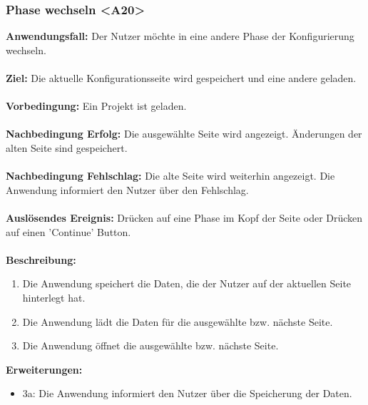 \documentclass[parskip=full]{scrartcl} %
\begin{document}
\subsubsection*{Phase wechseln <A20>}
\textbf{Anwendungsfall:} Der Nutzer möchte in eine andere Phase der Konfigurierung wechseln.\\\\
\textbf{Ziel:} Die aktuelle Konfigurationsseite wird gespeichert und eine andere geladen. \\\\
\textbf{Vorbedingung:} Ein Projekt ist geladen. \\\\
\textbf{Nachbedingung Erfolg:} Die ausgewählte Seite wird angezeigt. Änderungen der alten Seite sind gespeichert.\\\\
\textbf{Nachbedingung Fehlschlag:} Die alte Seite wird weiterhin angezeigt. Die Anwendung informiert den Nutzer über den Fehlschlag. \\\\
\textbf{Auslösendes Ereignis:} Drücken auf eine Phase im Kopf der Seite oder Drücken auf einen 'Continue' Button. \\\\
\textbf{Beschreibung:}
\begin{enumerate}
    \item Die Anwendung speichert die Daten, die der Nutzer auf der aktuellen Seite hinterlegt hat.
    \item Die Anwendung lädt die Daten für die ausgewählte bzw. nächste Seite.
    \item Die Anwendung öffnet die ausgewählte bzw. nächste Seite.
\end{enumerate}
\textbf{Erweiterungen:} 
\begin{itemize}
    \item 3a: Die Anwendung informiert den Nutzer über die Speicherung der Daten.
\end{itemize}
\newpage
\end{document}
